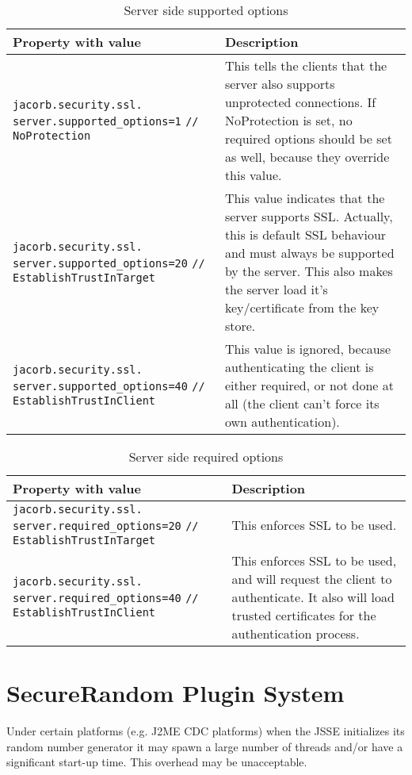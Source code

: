 \begin{table}
\caption{Server side supported options}
\begin{tabular}{|p{7cm}|p{7cm}|}
\hline
\textbf{Property with value}& \textbf{Description}\\
\hline
\verb"jacorb.security.ssl."
\verb"server.supported_options=1"
\verb"// NoProtection"& This tells the clients that the server also
supports unprotected connections. If NoProtection is set, no required
options should be set as well, because they override this value. \\
\hline
\verb"jacorb.security.ssl."
\verb"server.supported_options=20"
\verb"// EstablishTrustInTarget"& This value indicates that the server
supports SSL. Actually, this is default SSL behaviour and must always
be supported by the server. This also makes the server load it's
key/certificate from the key store.\\
\hline
\verb"jacorb.security.ssl."
\verb"server.supported_options=40"
\verb"// EstablishTrustInClient"&  This value is ignored, because
authenticating the client is either required, or not done at all (the
client can't force its own authentication).\\
\hline
\end{tabular}
\end{table}
\begin{table}

\caption{Server side required options}
\begin{tabular}{|p{7cm}|p{7cm}|}
\hline
\textbf{Property with value}& \textbf{Description}\\
\hline
\verb"jacorb.security.ssl."
\verb"server.required_options=20"
\verb"// EstablishTrustInTarget"& This enforces SSL to be used.\\
\hline
\verb"jacorb.security.ssl."
\verb"server.required_options=40"
\verb"// EstablishTrustInClient"&  This enforces SSL to be used, and
will request the client to authenticate. It also will load trusted
certificates for the authentication process.\\
\hline
\end{tabular}
\end{table}

\section{SecureRandom Plugin System}
\label{secureRandomPlugin}
Under certain platforms (e.g. J2ME CDC platforms) when the JSSE
initializes its random number generator it may spawn a large number
of threads and/or have a significant start-up time. This overhead may
be unacceptable.

